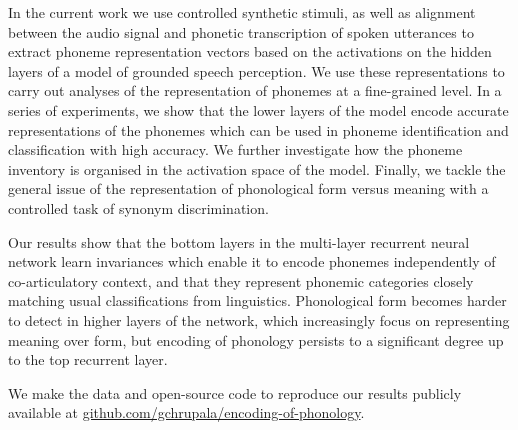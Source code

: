 In the current work we use controlled synthetic stimuli,
as well as  alignment between the audio signal and phonetic
transcription of spoken utterances to extract phoneme 
representation vectors based on the activations on the hidden 
layers of a model of grounded speech perception. We use these 
representations to carry out analyses of the representation of phonemes 
 at a fine-grained level. In a series of experiments, we show that 
 the lower layers of the model encode accurate representations 
 of the phonemes which can be used in phoneme identification and 
 classification with high accuracy. We further investigate how the 
 phoneme inventory is organised in the activation space of the 
 model. Finally, we tackle the general issue of the representation 
 of phonological form versus meaning with a controlled task of 
 synonym discrimination.
 
Our results show that the bottom layers in the multi-layer recurrent
neural network learn invariances which enable it to encode phonemes
independently of co-articulatory context, and that they represent
 phonemic categories closely matching usual classifications from
 linguistics. Phonological form becomes harder to detect in
 higher layers of the network, which increasingly focus on
 representing meaning over form, but encoding of phonology persists 
 to a significant degree up to the top recurrent layer.

We make the data and open-source code to reproduce our results publicly
available at
\href{https://github.com/gchrupala/encoding-of-phonology}{github.com/gchrupala/encoding-of-phonology}.

